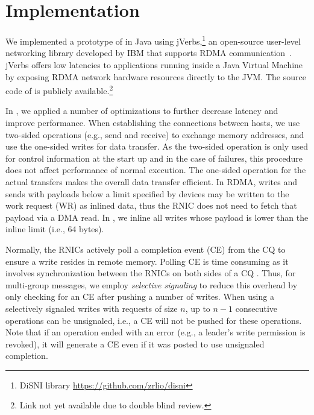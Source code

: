 \section{Implementation}
\label{sec:implementation}

%

We implemented a prototype of \libname in Java using jVerbs,\footnote{DiSNI
library \url{https://github.com/zrlio/disni}} an
open-source user-level networking library developed by IBM that supports RDMA
communication~\cite{stuedi2013jverbs}. jVerbs offers low latencies to applications running inside a Java
Virtual Machine by exposing RDMA network hardware resources directly to the JVM.
The source code of \libname is publicly available.\footnote{Link not yet available due to double blind review.}

In \libname, we applied a number of optimizations to further decrease latency
and improve performance. When establishing the connections between hosts, we
use two-sided operations (e.g., send and receive) to exchange memory addresses, and
use the one-sided writes for data transfer. As the two-sided operation is only
used for control information at the start up and in the case of failures, this procedure
does not affect performance of normal execution.
The one-sided operation for the actual
transfers makes the overall data transfer efficient. In RDMA, writes and sends
with payloads below a limit specified by devices may be written to the work
request (WR) as inlined data, thus the RNIC does not need to fetch that payload
via a DMA read. In \libname, we inline all writes whose payload is lower than
the inline limit (i.e., 64 bytes).

Normally, the RNICs actively poll a completion event (CE) from the CQ to ensure
a write resides in remote memory. Polling CE is time consuming as it involves
synchronization between the RNICs on both sides of a CQ \cite{APUS}. Thus,
for multi-group messages, we
employ \emph{selective signaling} \cite{Kalia2014} to reduce this overhead by
only checking for an CE after pushing a number of writes. When using a
selectively signaled writes with requests of size $n$, up to $n-1$ consecutive
operations can be unsignaled, i.e., a CE will not be pushed for these
operations. Note that if an operation ended with an error (e.g., a leader's
write permission is revoked), it will generate a CE even if it was posted to use
unsignaled completion.

